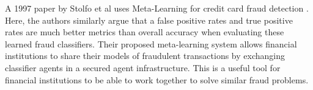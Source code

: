 \documentclass[midd]{thesis}
\begin{document}
%

A 1997 paper by Stolfo et al uses Meta-Learning for credit card fraud detection \cite{Stolfo1997}. Here, the authors similarly argue that a false positive rates and true positive rates are much better metrics than overall accuracy when evaluating these learned fraud classifiers. Their proposed meta-learning system allows financial institutions to share their models of fraudulent transactions by exchanging classifier agents in a secured agent infrastructure. This is a useful tool for financial institutions to be able to work together to solve similar fraud problems. 
\end{document}
